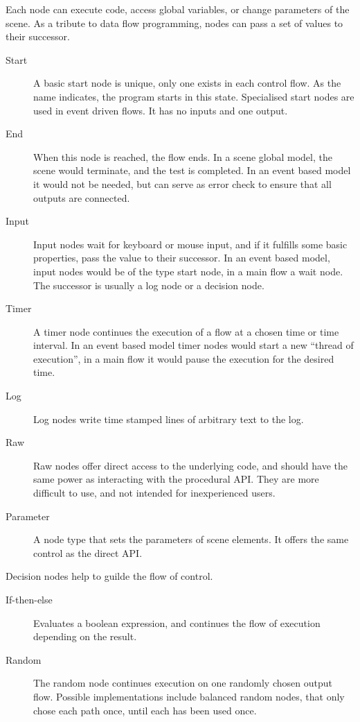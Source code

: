 Each node can  execute code, access global variables, or change parameters of the scene.
As a tribute to data flow programming, nodes can pass a set of values to their successor.

\begin{description}
\item[Start]
A basic start node is unique, only one exists in each control flow.
As the name indicates, the program starts in this state.
Specialised start nodes are used in event driven flows.
It has no inputs and one output.

\item[End]
When this node is reached, the flow ends.
In a scene global model, the scene would terminate, and the test is completed.
In an event based model it would not be needed, but can serve as error check to ensure that all outputs are connected.

\item[Input]
Input nodes wait for keyboard or mouse input, and if it fulfills some basic properties, pass the value to their successor.
In an event based model, input nodes would be of the type start node, in a main flow a wait node.
The successor is usually a log node or a decision node.

\item[Timer]
A timer node continues the execution of a flow at a chosen time or time interval.
In an event based model timer nodes would start a new ``thread of execution'',
in a main flow it would pause the execution for the desired time.

\item[Log]
Log nodes write time stamped lines of arbitrary text to the log.

\item[Raw]
Raw nodes offer direct access to the underlying code, and should have the same power as interacting with the procedural API.
They are more difficult to use, and not intended for inexperienced users.

\item[Parameter]
A node type that sets the parameters of scene elements.
It offers the same control as the direct API.

\end{description}

Decision nodes help to guilde the flow of control.

\begin{description}
\item[If-then-else]
Evaluates a boolean expression, and continues the flow of execution depending on the result.

\item[Random]
The random node continues execution on one randomly chosen output flow.
Possible implementations include balanced random nodes, that only chose each path once, until each has been used once.

\end{description}